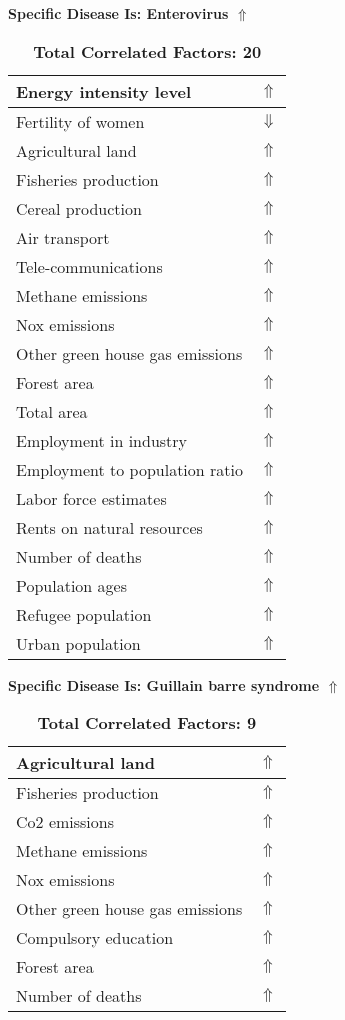 \documentclass[12pt,notitlepage,oneside]{report}
\begin{document}
\begin{table}[!htb]
\caption{\textbf{Specific Disease Is: Enterovirus $\Uparrow$}}
\centering
\label{Correlated Socio-economic Factors0}
\begin{tabular}{|l|l|}
\hline
Energy intensity level & $\Uparrow$\\ \hline
Fertility of women & $\Downarrow$\\ \hline
Agricultural land & $\Uparrow$\\ \hline
Fisheries production & $\Uparrow$\\ \hline
Cereal production & $\Uparrow$\\ \hline
Air transport  & $\Uparrow$\\ \hline
Tele-communications & $\Uparrow$\\ \hline
Methane emissions & $\Uparrow$\\ \hline
Nox emissions & $\Uparrow$\\ \hline
Other green house gas emissions & $\Uparrow$\\ \hline
Forest area & $\Uparrow$\\ \hline
Total area & $\Uparrow$\\ \hline
Employment in industry & $\Uparrow$\\ \hline
Employment to population ratio & $\Uparrow$\\ \hline
Labor force estimates & $\Uparrow$\\ \hline
Rents on natural resources & $\Uparrow$\\ \hline
Number of deaths & $\Uparrow$\\ \hline
Population ages & $\Uparrow$\\ \hline
Refugee population & $\Uparrow$\\ \hline
Urban population & $\Uparrow$\\ \hline
\end{tabular}
\caption*{\textbf{Total Correlated Factors: 20}}
\end{table}
\begin{table}[!htb]
\caption{\textbf{Specific Disease Is: Guillain barre syndrome $\Uparrow$}}
\centering
\label{Correlated Socio-economic Factors0}
\begin{tabular}{|l|l|}
\hline
Agricultural land & $\Uparrow$\\ \hline
Fisheries production & $\Uparrow$\\ \hline
Co2 emissions & $\Uparrow$\\ \hline
Methane emissions & $\Uparrow$\\ \hline
Nox emissions & $\Uparrow$\\ \hline
Other green house gas emissions & $\Uparrow$\\ \hline
Compulsory education & $\Uparrow$\\ \hline
Forest area & $\Uparrow$\\ \hline
Number of deaths & $\Uparrow$\\ \hline
\end{tabular}
\caption*{\textbf{Total Correlated Factors: 9}}
\end{table}
\end{document}
